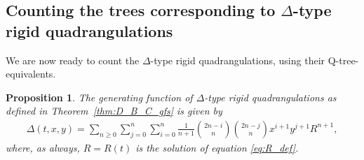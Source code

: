 \documentclass[11pt]{article}
\theoremstyle{plain}
\newtheorem{proposition}[theorem]{Proposition}
\theoremstyle{definition}
\begin{document}
\subsection{Counting the trees corresponding to \texorpdfstring{$\Delta$}{Delta}-type rigid quadrangulations}
We are now ready to count the $\Delta$-type rigid quadrangulations, using their Q-tree-equivalents.

\begin{proposition}\label{prop:D_counting}
   The generating function of $\Delta$-type rigid quadrangulations as defined in Theorem~\ref{thm:D_B_C_gfs} is given by
    \begin{align}
        \Delta(t,x,y)=\sum_{n\geq0}\sum_{j=0}^n\sum_{i=0}^n\frac{1}{n+1}\binom{2n-i}{n}\binom{2n-j}{n}x^{i+1}y^{j+1}R^{n+1},
    \end{align} 
    where, as always, $R=R(t)$ is the solution of equation \eqref{eq:R_def}. 
\end{proposition}
\end{document}

